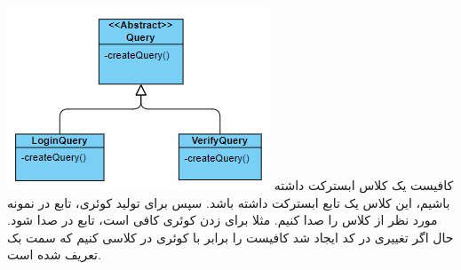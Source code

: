 \centering
\includegraphics[width = 0.6 \linewidth]{../figs/patterns/Adapter-Adaptee.png}
کافیست یک کلاس ابسترکت 
داشته باشیم، این کلاس یک تابع ابسترکت 
داشته باشد. سپس برای تولید کوئری، تابع 
در نمونه مورد نظر از کلاس را صدا کنیم. مثلا برای زدن کوئری 
کافی است، تابع 
در 
صدا شود. حال اگر تغییری در کد ایجاد شد کافیست 
 را برابر با کوئری در کلاسی کنیم که سمت بک تعریف شده است.
